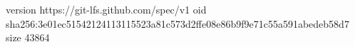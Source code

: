 version https://git-lfs.github.com/spec/v1
oid sha256:3e01ec51542124113115523a81c573d2ffe08e86b9f9e71c55a591abedeb58d7
size 43864
